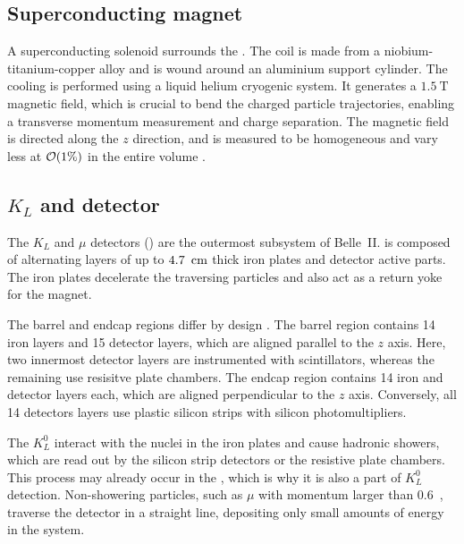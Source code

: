 \subsection{Superconducting magnet}\label{sec:magnet}

A superconducting solenoid surrounds the \ECL \cite{Belle-II:2010dht}.
The coil is made from a niobium-titanium-copper alloy and is wound around an aluminium support cylinder.
The cooling is performed using a liquid helium cryogenic system.
It generates a $1.5~\mathrm{T}$ magnetic field, which is crucial to bend the charged particle trajectories, enabling a transverse momentum measurement and charge separation.
The magnetic field is directed along the $z$ direction, and is measured to be homogeneous and vary less at ${\cal O}(1\%)$ in the entire volume \cite{BelleIITrackingGroup:2020hpx}.

\subsection{\texorpdfstring{$K_L$}{KL} and \texorpdfstring{\mu}{mu} detector}\label{sec:klm}

The $K_L$ and $\mu$ detectors (\KLM) \cite{Aushev:2014spa} are the outermost subsystem of Belle~II.
\KLM is composed of alternating layers of up to $4.7~{\rm \,cm}$ thick iron plates and detector active parts.
The iron plates decelerate the traversing particles and also act as a return yoke for the magnet.

The barrel and endcap regions differ by design \cite{Krohn:317929}.
The barrel region contains 14 iron layers and 15 detector layers, which are aligned parallel to the $z$ axis.
Here, two innermost detector layers are instrumented with scintillators, whereas the remaining use resisitve plate chambers.
The endcap region contains 14 iron and detector layers each, which are aligned perpendicular to the $z$ axis.
Conversely, all 14 detectors layers use plastic silicon strips with silicon photomultipliers.

The $K_L^0$ interact with the nuclei in the iron plates and cause hadronic showers, 
which are read out by the silicon strip detectors or the resistive plate chambers.
This process may already occur in the \ECL, which is why it is also a part of $K_L^0$ detection.
Non-showering particles, such as $\mu$ with momentum larger than 0.6~\gevc, traverse the detector in a straight line, 
depositing only small amounts of energy in the system.

